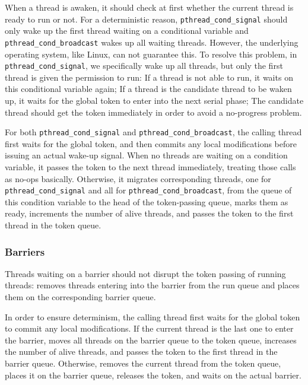 When a thread is awaken, it should check at first whether the current thread is ready to run or not. For a deterministic reason, \texttt{pthread\_cond\_signal} should only wake up the first thread waiting on a conditional variable and \texttt{pthread\_cond_broadcast} wakes up all waiting threads. However, the underlying operating system, like Linux, can not guarantee this. To resolve this problem, in \texttt{pthread\_cond\_signal}, we specifically wake up all threads, but only the first thread is given the permission to run: If a thread is not able to run, it waits on this conditional variable again; If a thread is the candidate thread to be waken up, it waits for the global token to enter into the next serial phase; The candidate thread should get the token immediately in order to avoid a no-progress problem. 

For both \texttt{pthread\_cond\_signal} and \texttt{pthread\_cond\_broadcast}, the calling thread first waits for the global token, and then commits any local modifications before issuing an actual wake-up signal. When no threads are waiting on a condition variable, it passes the token to the next thread immediately, treating those calls as no-ops basically. Otherwise, it migrates corresponding threads, one for \texttt{pthread\_cond\_signal} and all for \texttt{pthread\_cond\_broadcast}, from the queue of this condition variable to the head of the token-passing queue, marks them as ready, increments the number of alive threads, and passes the token to the first thread in the token queue. 

\subsubsection{Barriers}

\label{sec:barrierwait}

Threads waiting on a barrier should not disrupt the token passing of running threads: \dthreads{} removes threads entering into the barrier from the run queue and places them on the corresponding barrier queue.

In order to ensure determinism, the calling thread first waits for the global token to commit any local modifications. If the current thread is the last one to enter the barrier, \dthreads{} moves all threads on the barrier queue to the token queue, increases the number of alive threads, and passes the token to the first thread in the barrier queue. Otherwise, \dthreads{} removes the current thread from the token queue, places it on the barrier queue, releases the token, and waits on the actual barrier.


